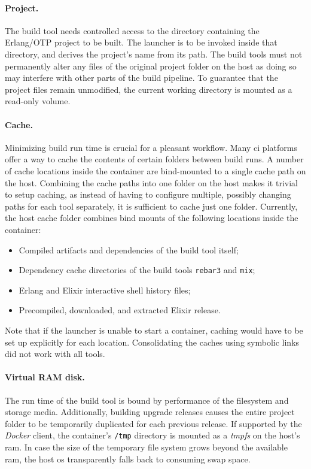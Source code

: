 \paragraph{Project.} The build tool needs controlled access to the directory containing the Erlang/OTP project to be built. The launcher is to be invoked inside that directory, and derives the project's name from its path. The build tools must not permanently alter any files of the original project folder on the host as doing so may interfere with other parts of the build pipeline. To guarantee that the project files remain unmodified, the current working directory is mounted as a read-only volume.

\paragraph{Cache.} Minimizing build run time is crucial for a pleasant workflow. Many \acrshort{ci} platforms offer a way to cache the contents of certain folders between build runs. A number of cache locations inside the container are bind-mounted to a single cache path on the host. Combining the cache paths into one folder on the host makes it trivial to setup caching, as instead of having to configure multiple, possibly changing paths for each tool separately, it is sufficient to cache just one folder. Currently, the host cache folder combines bind mounts of the following locations inside the container:
\begin{itemize}
  \item Compiled artifacts and dependencies of the build tool itself;
  \item Dependency cache directories of the build tools \lstinline|rebar3| and \lstinline|mix|;
  \item Erlang and Elixir interactive shell history files;
  \item Precompiled, downloaded, and extracted Elixir release.
\end{itemize}
Note that if the launcher is unable to start a container, caching would have to be set up explicitly for each location. Consolidating the caches using symbolic links did not work with all tools.

\paragraph{Virtual RAM disk.} The run time of the build tool is bound by performance of the filesystem and storage media. Additionally, building upgrade releases causes the entire project folder to be temporarily duplicated for each previous release.
If supported by the \emph{Docker} client, the container's \lstinline|/tmp| directory is mounted as a \emph{\acrfull{tmpfs}} on the host's \acrshort{ram}. In case the size of the temporary file system grows beyond the available \acrshort{ram}, the host \acrshort{os} transparently falls back to consuming swap space.

